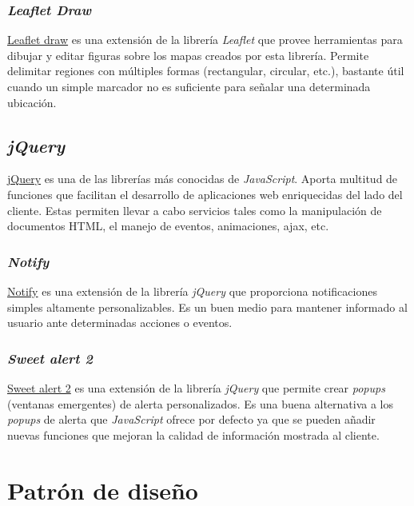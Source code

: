 \subsubsection{\emph{Leaflet Draw}}

\href{https://github.com/Leaflet/Leaflet.draw}{Leaflet draw} es una
extensión de la librería \emph{Leaflet} que provee herramientas para
dibujar y editar figuras sobre los mapas creados por esta librería.
Permite delimitar regiones con múltiples formas (rectangular, circular,
etc.), bastante útil cuando un simple marcador no es suficiente
para señalar una determinada ubicación.

\subsection{\emph{jQuery}}

\href{https://jquery.com/}{jQuery} es una de las librerías más conocidas
de \emph{JavaScript}. Aporta multitud de funciones que facilitan el
desarrollo de aplicaciones web enriquecidas del lado del cliente. Estas
permiten llevar a cabo servicios tales como la manipulación de
documentos HTML, el manejo de eventos, animaciones, ajax, etc.

\subsubsection{\emph{Notify}}

\href{https://notifyjs.jpillora.com/}{Notify} es una extensión de la
librería \emph{jQuery} que proporciona notificaciones simples altamente
personalizables. Es un buen medio para mantener informado al usuario
ante determinadas acciones o eventos.

\subsubsection{\emph{Sweet alert 2}}

\href{https://github.com/sweetalert2/sweetalert2}{Sweet alert 2} es una
extensión de la librería \emph{jQuery} que permite crear \emph{popups}
(ventanas emergentes) de alerta personalizados. Es una buena alternativa
a los \emph{popups} de alerta que \emph{JavaScript} ofrece por defecto ya que
se pueden añadir nuevas funciones que mejoran la calidad de información
mostrada al cliente.

\section{Patrón de diseño}

